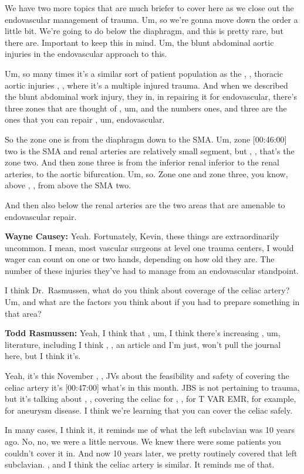 \documentclass[
]{book}
\begin{document}
We have two more topics that are much briefer to cover here as we close
out the endovascular management of trauma. Um, so we're gonna move down
the order a little bit. We're going to do below the diaphragm, and this
is pretty rare, but there are. Important to keep this in mind. Um, the
blunt abdominal aortic injuries in the endovascular approach to this.

Um, so many times it's a similar sort of patient population as the , ,
thoracic aortic injuries , , where it's a multiple injured trauma. And
when we described the blunt abdominal work injury, they in, in repairing
it for endovascular, there's three zones that are thought of , um, and
the numbers ones, and three are the ones that you can repair , um,
endovascular.

So the zone one is from the diaphragm down to the SMA. Um, zone
{[}00:46:00{]} two is the SMA and renal arteries are relatively small
segment, but , , that's the zone two. And then zone three is from the
inferior renal inferior to the renal arteries, to the aortic
bifurcation. Um, so. Zone one and zone three, you know, above , , from
above the SMA two.

And then also below the renal arteries are the two areas that are
amenable to endovascular repair.

\textbf{Wayne Causey:} Yeah. Fortunately, Kevin, these things are
extraordinarily uncommon. I mean, most vascular surgeons at level one
trauma centers, I would wager can count on one or two hands, depending
on how old they are. The number of these injuries they've had to manage
from an endovascular standpoint.

I think Dr.~Rasmussen, what do you think about coverage of the celiac
artery? Um, and what are the factors you think about if you had to
prepare something in that area?

\textbf{Todd Rasmussen:} Yeah, I think that , um, I think there's increasing
, um, literature, including I think , , an article and I'm just, won't
pull the journal here, but I think it's.

Yeah, it's this November , , JVs about the feasibility and safety of
covering the celiac artery it's {[}00:47:00{]} what's in this month. JBS is
not pertaining to trauma, but it's talking about , , covering the celiac
for , , for T VAR EMR, for example, for aneurysm disease. I think we're
learning that you can cover the celiac safely.

In many cases, I think it, it reminds me of what the left subclavian was
10 years ago. No, no, we were a little nervous. We knew there were some
patients you couldn't cover it in. And now 10 years later, we pretty
routinely covered that left subclavian. , and I think the celiac artery
is similar. It reminds me of that.
\end{document}
